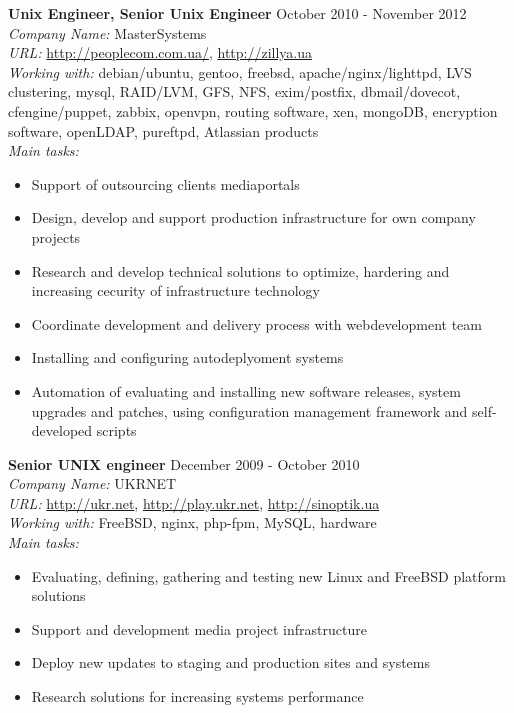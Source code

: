 \documentclass[mymargin,10pt]{res} %
\begin{document}
\begin{resume}
{\bf Unix Engineer, Senior Unix Engineer} \hfill October 2010 - November 2012 \\
{\sl Company Name:} MasterSystems \\
{\sl URL:} \url{http://peoplecom.com.ua/}, \url{http://zillya.ua}\\
{\sl Working with:} debian/ubuntu, gentoo, freebsd, apache/nginx/lighttpd, LVS clustering, mysql,
RAID/LVM, GFS, NFS, exim/postfix, dbmail/dovecot, cfengine/puppet, zabbix, openvpn, routing software,
xen, mongoDB, encryption software, openLDAP, pureftpd, Atlassian products \\
{\sl Main tasks:}
\begin{itemize}
\item Support of outsourcing clients mediaportals
\item Design, develop and support production infrastructure for own company projects
\item Research and develop technical solutions to optimize, hardering and increasing cecurity of infrastructure technology
\item Coordinate development and delivery process with webdevelopment team
\item Installing and configuring autodeplyoment systems
\item Automation of evaluating and installing new software releases, system upgrades and patches,
  using configuration management framework and self-developed scripts
\end{itemize}

{\bf Senior UNIX engineer} \hfill December 2009 - October 2010 \\
{\sl Company Name:} UKRNET \\
{\sl URL:} \url{http://ukr.net}, \url{http://play.ukr.net}, \url{http://sinoptik.ua} \\
{\sl Working with:} FreeBSD, nginx, php-fpm, MySQL, hardware \\
{\sl Main tasks:}
\begin{itemize}
\item Evaluating, defining, gathering and testing new Linux and FreeBSD platform solutions
\item Support and development media project infrastructure
\item Deploy new updates to staging and production sites and systems
\item Research solutions for increasing systems performance
\end{itemize}


\end{resume}
\end{document}
